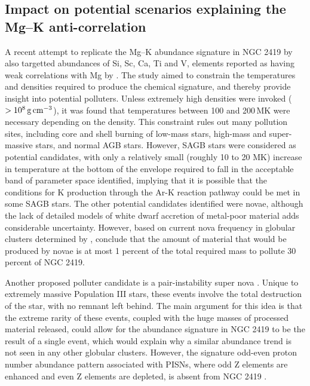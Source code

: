 \documentclass[a4paper,fleqn,usenatbib]{mnras}
\begin{document}
\subsection{Impact on potential scenarios explaining the Mg--K anti-correlation}



A recent attempt to replicate the Mg--K abundance signature in NGC 2419 by \cite{iliadis2016} also targetted abundances of Si, Sc, Ca, Ti and V, elements reported as having weak correlations with Mg by \cite{cohenkirby2012}. The study aimed to constrain the temperatures and densities required to produce the chemical signature, and thereby provide insight into potential polluters.
Unless extremely high densities were invoked ($>10^8\,{\rm g\,cm}^{-3}$), it was found that temperatures between 100 and 200\,MK were necessary depending on the density. This constraint rules out many pollution sites, including core and shell burning of low-mass stars, high-mass and super-massive stars, and normal AGB stars. However, SAGB stars were considered as potential candidates, with only a relatively small (roughly 10 to 20 MK) increase in temperature at the bottom of the envelope required to fall in the acceptable band of parameter space identified, implying that it is possible that the conditions for K production through the Ar-K reaction pathway could be met in some SAGB stars. The other potential candidates identified were novae, although the lack of detailed models of white dwarf accretion of metal-poor material adds considerable uncertainty. However, based on current nova frequency in globular clusters determined by \cite{kato2013novae}, \cite{iliadis2016} conclude that the amount of material that would be produced by novae is at most 1 percent of the total required mass to pollute 30 percent of NGC 2419.

Another proposed  polluter candidate is a pair-instability super nova \citep[PISN;][]{carretta2013}. Unique to extremely massive Population III stars, these events involve the total destruction of the star, with no remnant left behind. The main argument for this idea is that the extreme rarity of these events, coupled with the huge masses of processed material released, could allow for the abundance signature in NGC 2419 to be the result of a single event, which would explain why a similar abundance trend is not seen in any other globular clusters. However, the signature odd-even proton number abundance pattern associated with PISNs, where odd Z elements are enhanced and even Z elements are depleted, is absent from NGC 2419 \citep{carretta2013, cohenkirby2012}.
\end{document}
